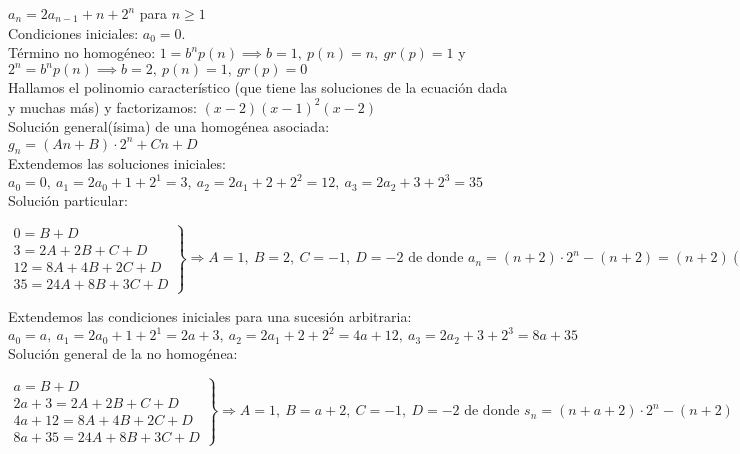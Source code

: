 \begin{ejemplo} $a_{n} = 2a_{n-1} + n + 2^n$ para $n \geq 1$ \\
    Condiciones iniciales: $a_{0} = 0$.\\
    Término no homogéneo: $1 = b^np(n) \implies b = 1, \ p(n) = n, \ gr(p) = 1$ y $2^n = b^np(n) \implies b = 2, \ p(n) = 1, \ gr(p) = 0$ \\
    Hallamos el polinomio característico (que tiene las soluciones de la ecuación dada y muchas más) y factorizamos: $(x-2)(x-1)^2(x-2)$\\
    Solución general(ísima) de una homogénea asociada: $g_{n} = (An + B) \cdot 2^n + Cn + D$ \\
    Extendemos las soluciones iniciales: $a_0 = 0, \ a_1 = 2a_0 +1 +2^1 = 3, \ a_2 = 2a_1 +2 +2^2 = 12, \ a_3 = 2a_2 +3 +2^3 = 35$ \\
    Solución particular:
    \begin{center}
        $\left.
            \begin{aligned}
                0 = B + D             \\
                3 = 2A + 2B + C + D   \\
                12 = 8A + 4B + 2C + D \\
                35 = 24A + 8B + 3C + D
            \end{aligned} \right \}
            \Rightarrow A = 1, \ B = 2, \ C = -1, \ D = -2 \text{ de donde } a_n = (n+2)\cdot 2^n - (n+2) = (n+2)(2^n-1)$
    \end{center}
    Extendemos las condiciones iniciales para una sucesión arbitraria: $a_0 = a, \ a_1 = 2a_0 +1 +2^1 = 2a+3, \ a_2 = 2a_1 +2 +2^2 = 4a+12, \ a_3 = 2a_2 +3 +2^3 = 8a+35$ \\
    Solución general  de la no homogénea:
    \begin{center}
        $\left.
            \begin{aligned}
                a = B + D                \\
                2a+3 = 2A + 2B + C + D   \\
                4a+12 = 8A + 4B + 2C + D \\
                8a+35 = 24A + 8B + 3C + D
            \end{aligned} \right \}
            \Rightarrow A = 1, \ B = a+2, \ C = -1, \ D = -2 \text{ de donde } s_n = (n+a+2)\cdot 2^n - (n+2)$
    \end{center}
\end{ejemplo}
\smallskip

